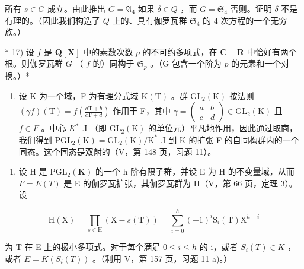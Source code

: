 所有 \(s \in G\) 成立。由此推出 \(G = \mathfrak{A}_4\) 如果 \(\delta \in Q\) ，而 \(G = \mathfrak{S}_4\) 否则。证明 \(\delta\) 不是有理的。（因此我们构造了 \(Q\) 上的、具有伽罗瓦群 \(\mathfrak{S}_4\) 的 4 次方程的一个无穷族。）

* 17) 设 \(f\) 是 \(\mathbf{Q}[\mathbf{X}]\) 中的素数次数 \(p\) 的不可约多项式，在 \(\mathbf{C} - \mathbf{R}\) 中恰好有两个根。则伽罗瓦群 \(G\) （ \(f\) 的）同构于 \(\mathfrak{S}_p\) 。（G 包含一个阶为 \(p\) 的元素和一个对换。）*

\begin{enumerate}
\def\labelenumi{\arabic{enumi})}
\setcounter{enumi}{17}
\tightlist
\item
  设 K 为一个域，F 为有理分式域 \(\mathrm{K}(\mathrm{T})\) 。群 \(\mathrm{GL}_{2}(\mathrm{K})\) 按法则 \((\gamma f)(\mathrm{T}) = f\left(\frac{a\mathrm{T} + b}{c\mathrm{T} + d}\right)\) 作用于 F，其中 \(\gamma = \begin{pmatrix} a & b \\ c & d \end{pmatrix} \in \mathrm{GL}_{2}(\mathrm{K})\) 且 \(f \in F\) 。中心 \(K^{*}\) .I （即 \(\mathrm{GL}_{2}(\mathrm{K})\) 的单位元）平凡地作用，因此通过取商，我们得到 \(\mathrm{PGL}_{2}(\mathrm{K}) = \mathrm{GL}_{2}(\mathrm{K}) / \mathrm{K}^{*}\) .I 到 K 的扩张 F 的自同构群内的一个同态。这个同态是双射的（V，第 148 页，习题 11）。
\end{enumerate}

\begin{enumerate}
\def\labelenumi{\alph{enumi})}
\tightlist
\item
  设 H 是 \(\mathrm{PGL}_{2}(\mathbf{K})\) 的一个 h 阶有限子群，并设 E 为 H 的不变量域，从而 \(F = E(T)\) 是 E 的伽罗瓦扩张，其伽罗瓦群为 H（V，第 66 页，定理 3）。设
\end{enumerate}

\[
\mathrm{H} (\mathrm{X}) = \prod_ {s \in \mathrm{H}} (\mathrm{X} - s (\mathrm{T})) = \sum_ {i = 0} ^ {h} (- 1) ^ {i} \mathrm{S} _ {i} (\mathrm{T}) \mathrm{X} ^ {h - i}
\]

为 T 在 E 上的极小多项式。对于每个满足 \(0 \leqslant i \leqslant h\) 的 i，或者 \(S_{i}(T) \in K\) ，或者 \(E = K(S_{i}(T))\) 。（利用 V，第 157 页，习题 11 a)。）

